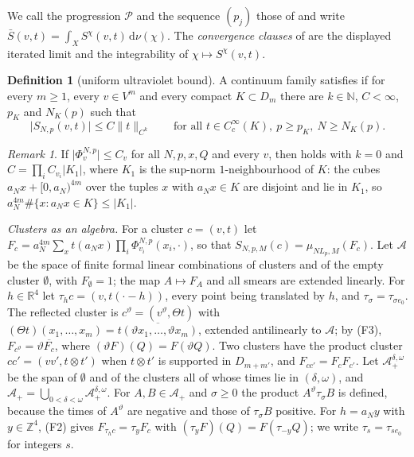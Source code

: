 \documentclass[11pt,a4paper]{amsart}
\theoremstyle{definition}
\newtheorem{definition}[theorem]{Definition}
\theoremstyle{remark}
\newtheorem{remark}[theorem]{Remark}
\numberwithin{equation}{section}
\newcommand{\R}{\mathbb{R}}          %
\newcommand{\Z}{\mathbb{Z}}          %
\newcommand{\Nat}{\mathbb{N}}        %
\newcommand{\norm}[1]{\lVert #1\rVert}     %
\newcommand{\abs}[1]{\lvert #1\rvert}      %
\newcommand{\dd}{\,\mathrm{d}}             %
\newcommand{\hypW}{\text{\upshape(W)}}              %
\newcommand{\UVB}{\text{\upshape(UVB)}}             %
\newcommand{\aN}{a_N}                      %
\newcommand{\Lp}{L_p}                      %
\begin{document}
We call the progression $\mathcal P$ and the sequence $(p_j)$ those of \hypW{} and write $\bar S(v,t)=\int_XS^\chi(v,t)\dd\nu(\chi)$. The \emph{convergence clauses} of \hypW{} are the displayed iterated limit and the integrability of $\chi\mapsto S^\chi(v,t)$.

\begin{definition}[uniform ultraviolet bound]\label{def:UVB}
A continuum family satisfies \UVB{} if for every $m\ge1$, every $v\in V^m$ and every compact $K\subset D_m$ there are $k\in\Nat$, $C<\infty$, $p_K$ and $N_K(p)$ such that
\[
\abs{S_{N,p}(v,t)}\le C\norm{t}_{C^k}\qquad\text{for all }t\in C^\infty_c(K),\ p\ge p_K,\ N\ge N_K(p).
\]
\end{definition}

\begin{remark}
If $\abs{\Phi^{N,p}_v}\le C_v$ for all $N,p,x,Q$ and every $v$, then \UVB{} holds with $k=0$ and $C=\prod_iC_{v_i}\abs{K_1}$, where $K_1$ is the sup-norm $1$-neighbourhood of $K$: the cubes $\aN x+[0,\aN)^{4m}$ over the tuples $x$ with $\aN x\in K$ are disjoint and lie in $K_1$, so $\aN^{4m}\#\{x:\aN x\in K\}\le\abs{K_1}$.
\end{remark}

\emph{Clusters as an algebra.} For a cluster $c=(v,t)$ let $F_c=\aN^{4m}\sum_xt(\aN x)\prod_i\Phi^{N,p}_{v_i}(x_i,\cdot)$, so that $S_{N,p,M}(c)=\mu_{N\Lp,M}(F_c)$. Let $\mathcal A$ be the space of finite formal linear combinations of clusters and of the empty cluster $\emptyset$, with $F_\emptyset=1$; the map $A\mapsto F_A$ and all smears are extended linearly. For $h\in\R^4$ let $\tau_hc=(v,t(\cdot-h))$, every point being translated by $h$, and $\tau_\sigma=\tau_{\sigma e_0}$. The reflected cluster is $c^\vartheta=(v^\vartheta,\Theta t)$ with $(\Theta t)(x_1,\dots,x_m)=\overline{t(\vartheta x_1,\dots,\vartheta x_m)}$, extended antilinearly to $\mathcal A$; by (F3), $F_{c^\vartheta}=\vartheta\overline{F_c}$, where $(\vartheta F)(Q)=F(\vartheta Q)$. Two clusters have the product cluster $cc'=(vv',t\otimes t')$ when $t\otimes t'$ is supported in $D_{m+m'}$, and $F_{cc'}=F_cF_{c'}$. Let $\mathcal A_+^{\delta,\omega}$ be the span of $\emptyset$ and of the clusters all of whose times lie in $(\delta,\omega)$, and $\mathcal A_+=\bigcup_{0<\delta<\omega}\mathcal A_+^{\delta,\omega}$. For $A,B\in\mathcal A_+$ and $\sigma\ge0$ the product $A^\vartheta\tau_\sigma B$ is defined, because the times of $A^\vartheta$ are negative and those of $\tau_\sigma B$ positive. For $h=\aN y$ with $y\in\Z^4$, (F2) gives $F_{\tau_hc}=\tau_yF_c$ with $(\tau_yF)(Q)=F(\tau_{-y}Q)$; we write $\tau_s=\tau_{se_0}$ for integers $s$.
\end{document}
